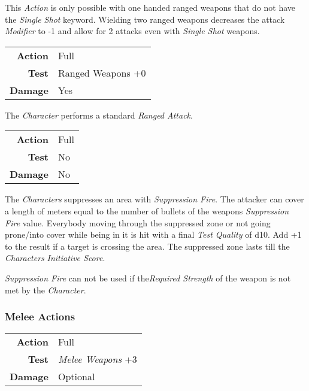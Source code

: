 This \emph{Action} is only possible with one handed ranged weapons that do
not have the \emph{Single Shot} keyword. Wielding two ranged weapons decreases
the attack \emph{Modifier} to -1 and allow for 2 attacks even with
\emph{Single Shot} weapons.

\begin{tabular}{rl}
    \textbf{Action} & Full              \\
    \textbf{Test}   & Ranged Weapons +0 \\
    \textbf{Damage} & Yes               \\
\end{tabular}

\hfill

The \emph{Character} performs a standard \emph{Ranged Attack}.


\begin{tabular}{rl}
    \textbf{Action} & Full \\
    \textbf{Test}   & No   \\
    \textbf{Damage} & No   \\
\end{tabular}

\hfill

The \emph{Characters} suppresses an area with \emph{Suppression Fire}.
The attacker can cover a length of meters equal to the number of bullets of the
weapons \emph{Suppression Fire} value. Everybody moving through the suppressed
zone or not going prone/into cover while being in it is hit with a final
\emph{Test Quality} of d10. Add +1 to the result if a target is crossing the
area. The suppressed zone lasts till the \emph{Characters} \emph{Initiative Score}.

\emph{Suppression Fire} can not be used if the\emph{Required Strength} of the
weapon is not met by the \emph{Character}.

\subsubsection{Melee Actions}


\begin{tabular}{rl}
    \textbf{Action} & Full                    \\
    \textbf{Test}   & \emph{Melee Weapons} +3 \\
    \textbf{Damage} & Optional                \\
\end{tabular}

